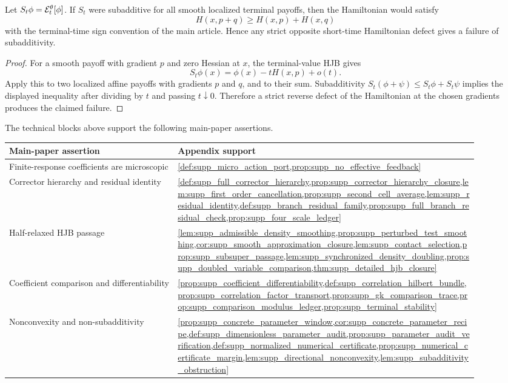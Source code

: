 \begin{lemma}
\label{lem:supp_subadditivity_obstruction}
Let \(S_t\phi=\mathcal E^\theta_t[\phi]\).  If \(S_t\) were subadditive for all smooth
localized terminal payoffs, then the Hamiltonian would satisfy
\[
  H(x,p+q)\ge H(x,p)+H(x,q)
\]
with the terminal-time sign convention of the main article.  Hence any strict
opposite short-time Hamiltonian defect gives a failure of subadditivity.
\end{lemma}

\begin{proof}
For a smooth payoff with gradient \(p\) and zero Hessian at \(x\), the
terminal-value HJB gives
\[
  S_t\phi(x)=\phi(x)-tH(x,p)+o(t).
\]
Apply this to two localized affine payoffs with gradients \(p\) and \(q\), and
to their sum.  Subadditivity
\(S_t(\phi+\psi)\le S_t\phi+S_t\psi\) implies the displayed inequality after
dividing by \(t\) and passing \(t\downarrow0\).  Therefore a strict reverse
defect of the Hamiltonian at the chosen gradients produces the claimed failure.
\end{proof}

\begin{proposition}
\label{prop:supp_hjb_crosswalk}
The technical blocks above support the following main-paper assertions.
\begin{center}
\small
\begin{tabular}{p{0.32\linewidth}p{0.58\linewidth}}
\hline
Main-paper assertion & Appendix support \\
\hline
Finite-response coefficients are microscopic &
\cref{def:supp_micro_action_port,prop:supp_no_effective_feedback} \\
Corrector hierarchy and residual identity &
\cref{def:supp_full_corrector_hierarchy,prop:supp_corrector_hierarchy_closure,lem:supp_first_order_cancellation,prop:supp_second_cell_average,lem:supp_residual_identity,def:supp_branch_residual_family,prop:supp_full_branch_residual_check,prop:supp_four_scale_ledger} \\
Half-relaxed HJB passage &
\cref{lem:supp_admissible_density_smoothing,prop:supp_perturbed_test_smoothing,cor:supp_smooth_approximation_closure,lem:supp_contact_selection,prop:supp_subsuper_passage,lem:supp_synchronized_density_doubling,prop:supp_doubled_variable_comparison,thm:supp_detailed_hjb_closure} \\
Coefficient comparison and differentiability &
\cref{prop:supp_coefficient_differentiability,def:supp_correlation_hilbert_bundle,prop:supp_correlation_factor_transport,prop:supp_gk_comparison_trace,prop:supp_comparison_modulus_ledger,prop:supp_terminal_stability} \\
Nonconvexity and non-subadditivity &
\cref{prop:supp_concrete_parameter_window,cor:supp_concrete_parameter_recipe,def:supp_dimensionless_parameter_audit,prop:supp_parameter_audit_verification,def:supp_normalized_numerical_certificate,prop:supp_numerical_certificate_margin,lem:supp_directional_nonconvexity,lem:supp_subadditivity_obstruction} \\
\hline
\end{tabular}
\end{center}
\end{proposition}

